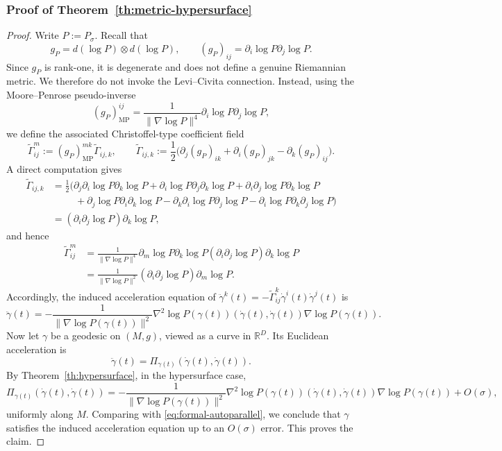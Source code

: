 \documentclass[11pt]{article}
\theoremstyle{plain}
\theoremstyle{definition}
\begin{document}
\subsubsection{Proof of Theorem~\ref{th:metric-hypersurface}}\label{sec:pf-metric hypersurface}
\begin{proof}
Write $P:=P_\sigma$. Recall that
\[
g_P=d(\log P)\otimes d(\log P),
\qquad
(g_P)_{ij}=\partial_i\log P\partial_j\log P.
\]
Since $g_P$ is rank-one, it is degenerate and does not define a genuine Riemannian metric. We therefore do not invoke the Levi--Civita connection. Instead, using the Moore--Penrose pseudo-inverse
\[
(g_P)_{\mathrm{MP}}^{ij}
=
\frac{1}{\|\nabla\log P\|^4}
\partial_i\log P\partial_j\log P,
\]
we define the associated Christoffel-type coefficient field
\[
\widetilde \Gamma^m_{ij}
:=
(g_P)_{\mathrm{MP}}^{mk}
\widetilde \Gamma_{ij,k},
\qquad
\widetilde \Gamma_{ij,k}
:=
\frac12
\big(
\partial_j(g_P)_{ik}
+\partial_i(g_P)_{jk}
-\partial_k(g_P)_{ij}
\big).
\]
A direct computation gives
\begin{align*}
\widetilde \Gamma_{ij,k}
&=
\frac{1}{2}\big(
\partial_j\partial_i\log P\partial_k\log P
+\partial_i\log P\partial_j\partial_k\log P
+\partial_i\partial_j\log P\partial_k\log P
\\
&\hspace{1cm}
+\partial_j\log P\partial_i\partial_k\log P
-\partial_k\partial_i\log P\partial_j\log P
-\partial_i\log P\partial_k\partial_j\log P
\big)
\\
&=
(\partial_i\partial_j\log P)\partial_k\log P,
\end{align*}
and hence
\begin{align*}
\widetilde\Gamma^m_{ij}
&=
\frac{1}{\|\nabla\log P\|^4}
\partial_m\log P\partial_k\log P
(\partial_i\partial_j\log P)\partial_k\log P
\\&=
\frac{1}{\|\nabla\log P\|^2}
(\partial_i\partial_j\log P)\partial_m\log P.
\end{align*}
Accordingly, the induced acceleration equation of $\ddot\gamma^k(t)=- \widetilde \Gamma^k_{ij} \dot\gamma^i(t)\dot\gamma^j(t)$ is
\begin{equation}\label{eq:formal-autoparallel}
\ddot\gamma(t)
=
-\frac{1}{\|\nabla\log P(\gamma(t))\|^2}
\nabla^2\log P(\gamma(t))(\dot\gamma(t),\dot\gamma(t))
\nabla\log P(\gamma(t)).
\end{equation}
Now let $\gamma$ be a geodesic on $(M,g)$, viewed as a curve in $\mathbb{R}^D$. Its Euclidean acceleration is
\[
\ddot\gamma(t)=\Pi_{\gamma(t)}(\dot\gamma(t),\dot\gamma(t)).
\]
By Theorem~\ref{th:hypersurface}, in the hypersurface case,
\[
\Pi_{\gamma(t)}(\dot\gamma(t),\dot\gamma(t))
=
-\frac{1}{\|\nabla\log P(\gamma(t))\|^2}
\nabla^2\log P(\gamma(t))(\dot\gamma(t),\dot\gamma(t))
\nabla\log P(\gamma(t))
+O(\sigma),
\]
uniformly along $M$. Comparing with \eqref{eq:formal-autoparallel}, we conclude that $\gamma$ satisfies the induced acceleration equation up to an $O(\sigma)$ error. This proves the claim.
\end{proof}
\end{document}
